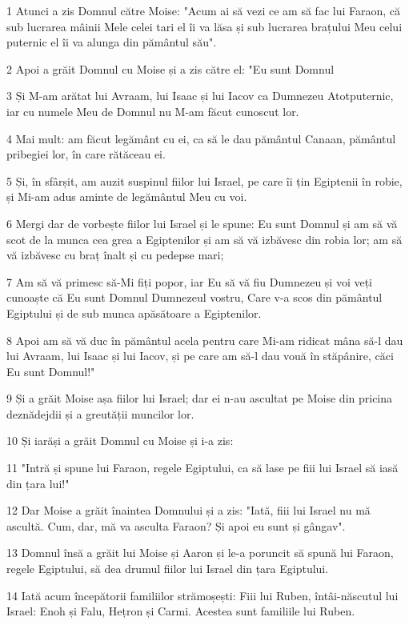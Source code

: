 \par 1 Atunci a zis Domnul către Moise: "Acum ai să vezi ce am să fac lui Faraon, că sub lucrarea mâinii Mele celei tari el îi va lăsa și sub lucrarea brațului Meu celui puternic el îi va alunga din pământul său".
\par 2 Apoi a grăit Domnul cu Moise și a zis către el: "Eu sunt Domnul
\par 3 Și M-am arătat lui Avraam, lui Isaac și lui Iacov ca Dumnezeu Atotputernic, iar cu numele Meu de Domnul nu M-am făcut cunoscut lor.
\par 4 Mai mult: am făcut legământ cu ei, ca să le dau pământul Canaan, pământul pribegiei lor, în care rătăceau ei.
\par 5 Și, în sfârșit, am auzit suspinul fiilor lui Israel, pe care îi țin Egiptenii în robie, și Mi-am adus aminte de legământul Meu cu voi.
\par 6 Mergi dar de vorbește fiilor lui Israel și le spune: Eu sunt Domnul și am să vă scot de la munca cea grea a Egiptenilor și am să vă izbăvesc din robia lor; am să vă izbăvesc cu braț înalt și cu pedepse mari;
\par 7 Am să vă primesc să-Mi fiți popor, iar Eu să vă fiu Dumnezeu și voi veți cunoaște că Eu sunt Domnul Dumnezeul vostru, Care v-a scos din pământul Egiptului și de sub munca apăsătoare a Egiptenilor.
\par 8 Apoi am să vă duc în pământul acela pentru care Mi-am ridicat mâna să-l dau lui Avraam, lui Isaac și lui Iacov, și pe care am să-l dau vouă în stăpânire, căci Eu sunt Domnul!"
\par 9 Și a grăit Moise așa fiilor lui Israel; dar ei n-au ascultat pe Moise din pricina deznădejdii și a greutății muncilor lor.
\par 10 Și iarăși a grăit Domnul cu Moise și i-a zis:
\par 11 "Intră și spune lui Faraon, regele Egiptului, ca să lase pe fiii lui Israel să iasă din țara lui!"
\par 12 Dar Moise a grăit înaintea Domnului și a zis: "Iată, fiii lui Israel nu mă ascultă. Cum, dar, mă va asculta Faraon? Și apoi eu sunt și gângav".
\par 13 Domnul însă a grăit lui Moise și Aaron și le-a poruncit să spună lui Faraon, regele Egiptului, să dea drumul fiilor lui Israel din țara Egiptului.
\par 14 Iată acum începătorii familiilor strămoșești: Fiii lui Ruben, întâi-născutul lui Israel: Enoh și Falu, Hețron și Carmi. Acestea sunt familiile lui Ruben.
